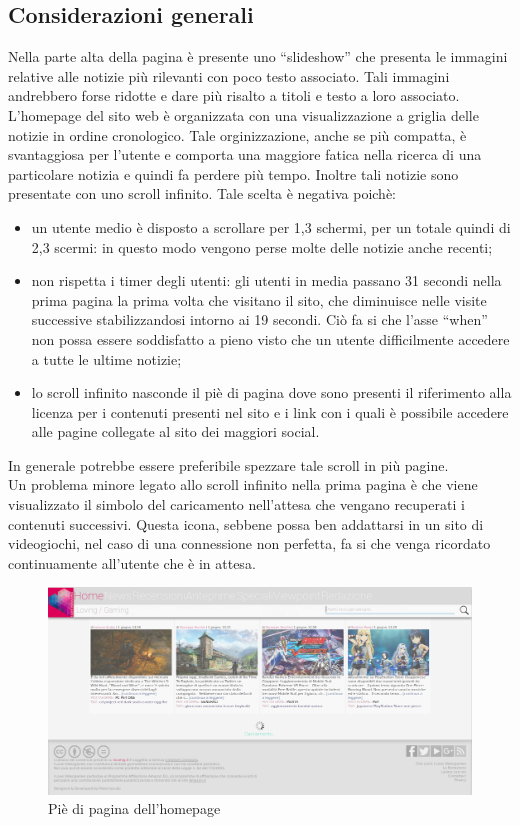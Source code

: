 \documentclass[../ProgettoTecWeb2.tex]{subfiles}
\begin{document}
	\subsection{Considerazioni generali}
		Nella parte alta della pagina è presente uno ``slideshow'' che presenta le immagini relative alle notizie più rilevanti con poco testo associato. Tali immagini andrebbero forse ridotte e dare più risalto a titoli e testo a loro associato.
		L'homepage del sito web è organizzata con una visualizzazione a griglia delle notizie in ordine cronologico. Tale orginizzazione, anche se più compatta, è svantaggiosa per l'utente e comporta una maggiore fatica nella ricerca di una particolare notizia e quindi fa perdere più tempo.
		Inoltre tali notizie sono presentate con uno scroll infinito. Tale scelta è negativa poichè:
		\begin{itemize}
			\item un utente medio è disposto a scrollare per 1,3 schermi, per un totale quindi di 2,3 scermi: in questo modo vengono perse molte delle notizie anche recenti;
			\item non rispetta i timer degli utenti: gli utenti in media passano 31 secondi nella prima pagina la prima volta che visitano il sito, che diminuisce nelle visite successive stabilizzandosi intorno ai 19 secondi. Ciò fa si che l'asse ``when'' non possa essere soddisfatto a pieno visto che un utente difficilmente accedere a tutte le ultime notizie;
			\item lo scroll infinito nasconde il piè di pagina dove sono presenti il riferimento alla licenza per i contenuti presenti nel sito e i link con i quali è possibile accedere alle pagine collegate al sito dei maggiori social. 
		\end{itemize}
		In generale potrebbe essere preferibile spezzare tale scroll in più pagine. \\
		Un problema minore legato allo scroll infinito nella prima pagina è che viene visualizzato il simbolo del caricamento nell'attesa che vengano recuperati i contenuti successivi. Questa icona, sebbene possa ben addattarsi in un sito di videogiochi, nel caso di una connessione non perfetta, fa si che venga ricordato continuamente all'utente che è in attesa.
		\begin{figure} [H]
			\centering
			\includegraphics[scale=0.3]{img/PieDiPaginaHomepage}
			\caption{Piè di pagina dell'homepage}
		\end{figure}
\end{document}
